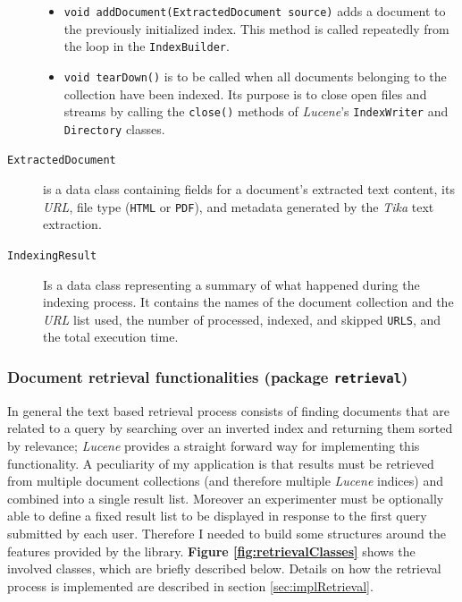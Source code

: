 \documentclass[a4paper]{usiinfbachelorproject}
\begin{document}
\begin{description}
\begin{itemize}
                \item \texttt{void addDocument(ExtractedDocument source)} adds a document to the previously initialized
                      index. This method is called repeatedly from the loop in the \texttt{IndexBuilder}.

                \item \texttt{void tearDown()} is to be called when all documents belonging to the collection
                      have been indexed. Its purpose is to close open files and streams by calling the \texttt{close()}
                      methods of \emph{Lucene}'s \texttt{IndexWriter} and \texttt{Directory} classes.

            \end{itemize}

        \item[\texttt{ExtractedDocument}] is a data class containing fields for a document's extracted text content, its \emph{URL}, file type 
                (\texttt{HTML} or \texttt{PDF}), and metadata generated by the \emph{Tika} text extraction.

        \item[\texttt{IndexingResult}] Is a data class representing a summary of what happened during the indexing process.
                It contains the names of the document collection and the \emph{URL} list used, the number of
                processed, indexed, and skipped \texttt{URLS}, and the total execution time.


    \end{description}


\subsubsection{\textbf{Document retrieval functionalities (package \texttt{retrieval})}} \label{sec:archDataLayerRetrieval}

In general the text based retrieval process consists of finding documents that are related to a query by searching over an inverted index
 and returning them sorted by relevance; \emph{Lucene} provides a straight forward way for implementing this functionality. A peculiarity of
my application is that results must be retrieved from multiple document collections (and therefore multiple \emph{Lucene} indices) and
combined into a single result list. Moreover an experimenter must be optionally able to define a fixed result list to be displayed 
in response to the first query submitted by each user. Therefore I needed to build some structures around the features provided by the library. 
\textbf{Figure \ref{fig:retrievalClasses}} shows the involved classes, which are briefly described below. Details
on how the retrieval process is implemented are described in section \ref{sec:implRetrieval}.
\end{document}

